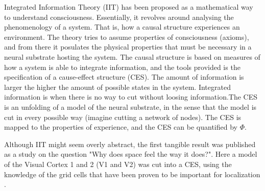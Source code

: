 Integrated Information Theory (IIT) has been proposed as a mathematical way to understand consciousness.
Essentially, it revolves around analysing the phenomenology of a system.
That is, how a causal structure experiences an environment.
The theory tries to assume properties of consciousness (axioms), and from there it posulates the physical properties that must be necessary in a neural substrate hosting the system.
The causal structure is based on measures of how a system is able to integrate information, and the tools provided is the specification of a cause-effect structure (CES).
The amount of information is larger the higher the amount of possible states in the system. Integrated information is when there is no way to cut without loosing information.The CES is an unfolding of a model of the neural substrate, in the sense that the model is cut in every possible way (imagine cutting a network of nodes).
The CES is mapped to the properties of experience, and the CES can be quantified by $\Phi$. \cite{tononi_phi3}

Although IIT might seem overly abstract, the first tangible result was published as a study on the question "Why does space feel the way it does?".
Here a model of the Visual Cortex 1 and 2 (V1 and V2) was cut into a CES, using the knowledge of the grid cells that have been proven to be important for localization \cite{haun_space}.
